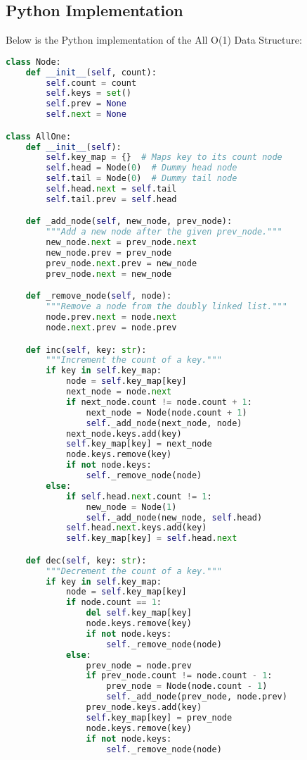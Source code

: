 \subsection*{Python Implementation}
Below is the Python implementation of the All O(1) Data Structure:

\begin{fullwidth}
\begin{lstlisting}[language=Python]
class Node:
    def __init__(self, count):
        self.count = count
        self.keys = set()
        self.prev = None
        self.next = None

class AllOne:
    def __init__(self):
        self.key_map = {}  # Maps key to its count node
        self.head = Node(0)  # Dummy head node
        self.tail = Node(0)  # Dummy tail node
        self.head.next = self.tail
        self.tail.prev = self.head

    def _add_node(self, new_node, prev_node):
        """Add a new node after the given prev_node."""
        new_node.next = prev_node.next
        new_node.prev = prev_node
        prev_node.next.prev = new_node
        prev_node.next = new_node

    def _remove_node(self, node):
        """Remove a node from the doubly linked list."""
        node.prev.next = node.next
        node.next.prev = node.prev

    def inc(self, key: str):
        """Increment the count of a key."""
        if key in self.key_map:
            node = self.key_map[key]
            next_node = node.next
            if next_node.count != node.count + 1:
                next_node = Node(node.count + 1)
                self._add_node(next_node, node)
            next_node.keys.add(key)
            self.key_map[key] = next_node
            node.keys.remove(key)
            if not node.keys:
                self._remove_node(node)
        else:
            if self.head.next.count != 1:
                new_node = Node(1)
                self._add_node(new_node, self.head)
            self.head.next.keys.add(key)
            self.key_map[key] = self.head.next

    def dec(self, key: str):
        """Decrement the count of a key."""
        if key in self.key_map:
            node = self.key_map[key]
            if node.count == 1:
                del self.key_map[key]
                node.keys.remove(key)
                if not node.keys:
                    self._remove_node(node)
            else:
                prev_node = node.prev
                if prev_node.count != node.count - 1:
                    prev_node = Node(node.count - 1)
                    self._add_node(prev_node, node.prev)
                prev_node.keys.add(key)
                self.key_map[key] = prev_node
                node.keys.remove(key)
                if not node.keys:
                    self._remove_node(node)


\end{lstlisting}
\end{fullwidth}
